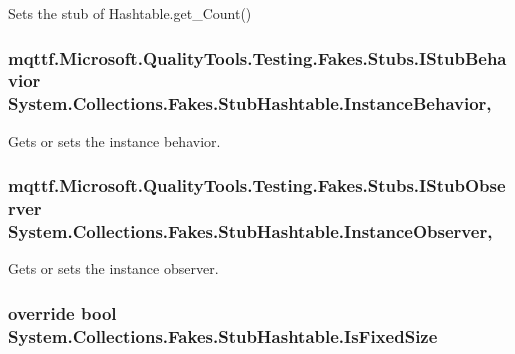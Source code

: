 Sets the stub of Hashtable.\-get\-\_\-\-Count()

\hypertarget{class_system_1_1_collections_1_1_fakes_1_1_stub_hashtable_a0133ff3c48f00ec7f63bc4c99e97b4ae}{
\subsubsection[{Instance\-Behavior}]{\setlength{\rightskip}{0pt plus 5cm}mqttf.\-Microsoft.\-Quality\-Tools.\-Testing.\-Fakes.\-Stubs.\-I\-Stub\-Behavior System.\-Collections.\-Fakes.\-Stub\-Hashtable.\-Instance\-Behavior\hspace{0.3cm}{\ttfamily [get]}, {\ttfamily [set]}}}\label{class_system_1_1_collections_1_1_fakes_1_1_stub_hashtable_a0133ff3c48f00ec7f63bc4c99e97b4ae}


Gets or sets the instance behavior.

\hypertarget{class_system_1_1_collections_1_1_fakes_1_1_stub_hashtable_a6202d3c90797a792f8693daa0f1f0f7a}{
\subsubsection[{Instance\-Observer}]{\setlength{\rightskip}{0pt plus 5cm}mqttf.\-Microsoft.\-Quality\-Tools.\-Testing.\-Fakes.\-Stubs.\-I\-Stub\-Observer System.\-Collections.\-Fakes.\-Stub\-Hashtable.\-Instance\-Observer\hspace{0.3cm}{\ttfamily [get]}, {\ttfamily [set]}}}\label{class_system_1_1_collections_1_1_fakes_1_1_stub_hashtable_a6202d3c90797a792f8693daa0f1f0f7a}


Gets or sets the instance observer.

\hypertarget{class_system_1_1_collections_1_1_fakes_1_1_stub_hashtable_aba7eaeca181236d8d07728949e40f8d7}{
\subsubsection[{Is\-Fixed\-Size}]{\setlength{\rightskip}{0pt plus 5cm}override bool System.\-Collections.\-Fakes.\-Stub\-Hashtable.\-Is\-Fixed\-Size\hspace{0.3cm}{\ttfamily [get]}}}\label{class_system_1_1_collections_1_1_fakes_1_1_stub_hashtable_aba7eaeca181236d8d07728949e40f8d7}


